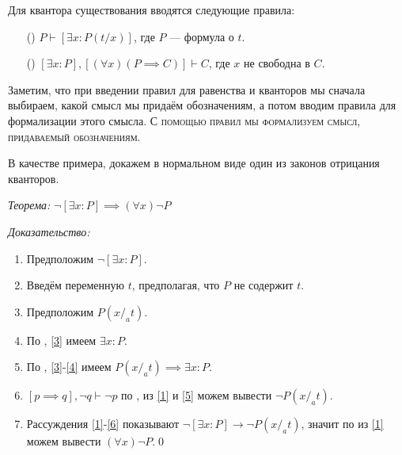 Для квантора существования вводятся следующие правила:
\begin{enumerate}
	\item[(\Eii{})]$P\vdash [\exists x:P(t/x)]$, где $P$ --- формула о $t$.
	\item[(\Eee{})]$[\exists x:P],[(\forall x)(P\implies C)]\vdash C$,
	где $x$ не свободна в $C$.
\end{enumerate}

Заметим, что при введении правил для равенства и кванторов мы
сначала выбираем, какой смысл мы придаём обозначениям, а потом вводим
правила для формализации этого смысла.
\textsc{С помощью правил мы формализуем смысл, придаваемый обозначениям.}

В качестве примера, докажем в нормальном виде один из законов отрицания кванторов.

{\it Теорема:} $\lnot [\exists x:P]\implies  (\forall x)\lnot P$

{\it Доказательство:}
\begin{enumerate}[label=(\arabic*)]
	\item{}\label{1}Предположим $\lnot [\exists x:P]$.
	\item{}\label{2}Введём переменную $t$, предполагая, что $P$ не содержит $t$.
	\item{}\label{3}Предположим $P(x/_{a}t)$.
	\item{}\label{4}По \Eii{}, \ref{3} имеем $\exists x:P$.
	\item{}\label{5}По \implic{}, \ref{3}-\ref{4} имеем
	$P(x/_{a}t)\implies \exists x:P$.
	\item{}\label{6}${[p\implies q],\lnot q\vdash \lnot p}$ по \taut{}, из
	\ref{1} и \ref{5} можем вывести $\lnot P(x/_{a}t)$.
	\item{}\label{7}Рассуждения \ref{1}-\ref{6} показывают
	$\lnot[\exists x:P]\to\lnot P(x/_{a}t)$, значит по \Aii{} из \ref{1} можем
	вывести $(\forall x)\lnot P$.\qed
\end{enumerate}

